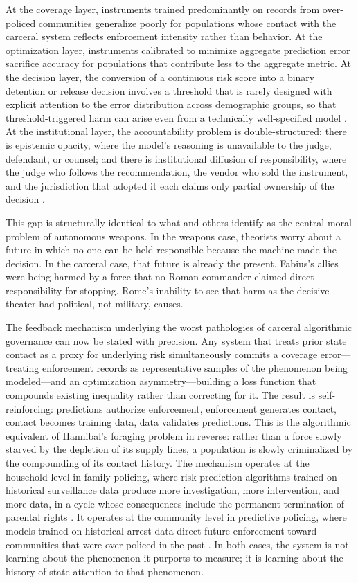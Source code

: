 \documentclass[12pt, a4paper]{article}
\begin{document}
At the coverage layer, instruments trained predominantly on records from over-policed communities generalize poorly for populations whose contact with the carceral system reflects enforcement intensity rather than behavior. At the optimization layer, instruments calibrated to minimize aggregate prediction error sacrifice accuracy for populations that contribute less to the aggregate metric. At the decision layer, the conversion of a continuous risk score into a binary detention or release decision involves a threshold that is rarely designed with explicit attention to the error distribution across demographic groups, so that threshold-triggered harm can arise even from a technically well-specified model \citep{corbett2018}. At the institutional layer, the accountability problem is double-structured: there is epistemic opacity, where the model's reasoning is unavailable to the judge, defendant, or counsel; and there is institutional diffusion of responsibility, where the judge who follows the recommendation, the vendor who sold the instrument, and the jurisdiction that adopted it each claims only partial ownership of the decision \citep{busuioc2020, kleinberg2018}.

This gap is structurally identical to what \citet{taddeo2022} and others identify as the central moral problem of autonomous weapons. In the weapons case, theorists worry about a future in which no one can be held responsible because the machine made the decision. In the carceral case, that future is already the present. Fabius's allies were being harmed by a force that no Roman commander claimed direct responsibility for stopping. Rome's inability to see that harm as the decisive theater had political, not military, causes.

The feedback mechanism underlying the worst pathologies of carceral algorithmic governance can now be stated with precision. Any system that treats prior state contact as a proxy for underlying risk simultaneously commits a coverage error---treating enforcement records as representative samples of the phenomenon being modeled---and an optimization asymmetry---building a loss function that compounds existing inequality rather than correcting for it. The result is self-reinforcing: predictions authorize enforcement, enforcement generates contact, contact becomes training data, data validates predictions. This is the algorithmic equivalent of Hannibal's foraging problem in reverse: rather than a force slowly starved by the depletion of its supply lines, a population is slowly criminalized by the compounding of its contact history. The mechanism operates at the household level in family policing, where risk-prediction algorithms trained on historical surveillance data produce more investigation, more intervention, and more data, in a cycle whose consequences include the permanent termination of parental rights \citep{escholarship2025, acm2023}. It operates at the community level in predictive policing, where models trained on historical arrest data direct future enforcement toward communities that were over-policed in the past \citep{flalawreview2023}. In both cases, the system is not learning about the phenomenon it purports to measure; it is learning about the history of state attention to that phenomenon.
\end{document}

